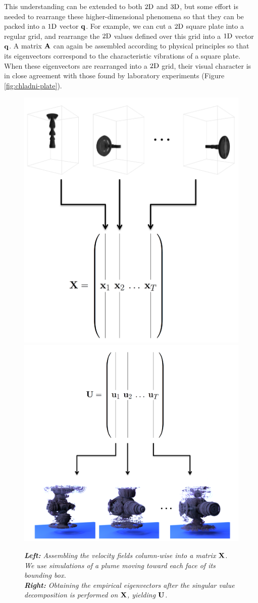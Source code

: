 This understanding can be extended to both $2\textnormal{D}$ and $3\textnormal{D}$, but some effort is needed to rearrange these higher-dimensional phenomena so that they can be packed into a $1\textnormal{D}$ vector $\mathbf{q}$. For example, we can cut a $2\textnormal{D}$ square plate into a regular grid, and rearrange the $2\textnormal{D}$ values defined over this grid into a $1\textnormal{D}$ vector $\mathbf{q}$. A matrix $\mathbf{A}$ can again be assembled according to physical principles so that its eigenvectors correspond to the characteristic vibrations of a square plate. When these eigenvectors are rearranged into a $2\textnormal{D}$ grid, their visual character is in close agreement with those found by laboratory experiments (Figure \ref{fig:chladni-plate}).


\begin{figure}[H]
		\centering
		\includegraphics[height=0.45\textwidth]{chap5/figures/plume_inverted_training.png}
		\includegraphics[height=0.45\textwidth]{chap5/figures/U_trunc_T.png}
		\caption{{\em{\bf Left:} Assembling the velocity fields column-wise into a matrix $\mathbf{X}$. We use simulations of a plume moving toward each face of its bounding box.}\\{\em{\bf Right:} Obtaining the empirical eigenvectors after the singular value decomposition is performed on $\mathbf{X}$, yielding $\mathbf{U}$.}}
		\label{fig:matrices}
\end{figure}
